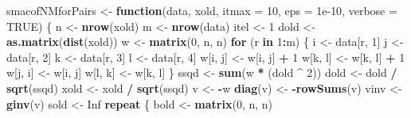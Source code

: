 \documentclass[
  12pt,
]{article}
\newenvironment{Shaded}{\begin{snugshade}}{\end{snugshade}}
\newcommand{\AttributeTok}[1]{\textcolor[rgb]{0.13,0.29,0.53}{#1}}
\newcommand{\ConstantTok}[1]{\textcolor[rgb]{0.56,0.35,0.01}{#1}}
\newcommand{\ControlFlowTok}[1]{\textcolor[rgb]{0.13,0.29,0.53}{\textbf{#1}}}
\newcommand{\DecValTok}[1]{\textcolor[rgb]{0.00,0.00,0.81}{#1}}
\newcommand{\FloatTok}[1]{\textcolor[rgb]{0.00,0.00,0.81}{#1}}
\newcommand{\FunctionTok}[1]{\textcolor[rgb]{0.13,0.29,0.53}{\textbf{#1}}}
\newcommand{\NormalTok}[1]{#1}
\newcommand{\OtherTok}[1]{\textcolor[rgb]{0.56,0.35,0.01}{#1}}
\newcommand{\SpecialCharTok}[1]{\textcolor[rgb]{0.81,0.36,0.00}{\textbf{#1}}}
\begin{document}
\begin{Shaded}
\begin{Highlighting}[]
\NormalTok{smacofNMforPairs }\OtherTok{\textless{}{-}}
  \ControlFlowTok{function}\NormalTok{(data,}
\NormalTok{           xold,}
           \AttributeTok{itmax =} \DecValTok{10}\NormalTok{,}
           \AttributeTok{eps =} \FloatTok{1e{-}10}\NormalTok{,}
           \AttributeTok{verbose =} \ConstantTok{TRUE}\NormalTok{) \{}
\NormalTok{    n }\OtherTok{\textless{}{-}} \FunctionTok{nrow}\NormalTok{(xold)}
\NormalTok{    m }\OtherTok{\textless{}{-}} \FunctionTok{nrow}\NormalTok{(data)}
\NormalTok{    itel }\OtherTok{\textless{}{-}} \DecValTok{1}
\NormalTok{    dold }\OtherTok{\textless{}{-}} \FunctionTok{as.matrix}\NormalTok{(}\FunctionTok{dist}\NormalTok{(xold))}
\NormalTok{    w }\OtherTok{\textless{}{-}} \FunctionTok{matrix}\NormalTok{(}\DecValTok{0}\NormalTok{, n, n)}
    \ControlFlowTok{for}\NormalTok{ (r }\ControlFlowTok{in} \DecValTok{1}\SpecialCharTok{:}\NormalTok{m) \{}
\NormalTok{      i }\OtherTok{\textless{}{-}}\NormalTok{ data[r, }\DecValTok{1}\NormalTok{]}
\NormalTok{      j }\OtherTok{\textless{}{-}}\NormalTok{ data[r, }\DecValTok{2}\NormalTok{]}
\NormalTok{      k }\OtherTok{\textless{}{-}}\NormalTok{ data[r, }\DecValTok{3}\NormalTok{]}
\NormalTok{      l }\OtherTok{\textless{}{-}}\NormalTok{ data[r, }\DecValTok{4}\NormalTok{]}
\NormalTok{      w[i, j] }\OtherTok{\textless{}{-}}\NormalTok{ w[i, j] }\SpecialCharTok{+} \DecValTok{1}
\NormalTok{      w[k, l] }\OtherTok{\textless{}{-}}\NormalTok{ w[k, l] }\SpecialCharTok{+} \DecValTok{1}
\NormalTok{      w[j, i] }\OtherTok{\textless{}{-}}\NormalTok{ w[i, j]}
\NormalTok{      w[l, k] }\OtherTok{\textless{}{-}}\NormalTok{ w[k, l]}
\NormalTok{    \}}
\NormalTok{    ssqd }\OtherTok{\textless{}{-}} \FunctionTok{sum}\NormalTok{(w }\SpecialCharTok{*}\NormalTok{ (dold }\SpecialCharTok{\^{}} \DecValTok{2}\NormalTok{))}
\NormalTok{    dold }\OtherTok{\textless{}{-}}\NormalTok{ dold }\SpecialCharTok{/} \FunctionTok{sqrt}\NormalTok{(ssqd)}
\NormalTok{    xold }\OtherTok{\textless{}{-}}\NormalTok{ xold }\SpecialCharTok{/} \FunctionTok{sqrt}\NormalTok{(ssqd)}
\NormalTok{    v }\OtherTok{\textless{}{-}} \SpecialCharTok{{-}}\NormalTok{w}
    \FunctionTok{diag}\NormalTok{(v) }\OtherTok{\textless{}{-}} \SpecialCharTok{{-}}\FunctionTok{rowSums}\NormalTok{(v)}
\NormalTok{    vinv }\OtherTok{\textless{}{-}} \FunctionTok{ginv}\NormalTok{(v)}
\NormalTok{    sold }\OtherTok{\textless{}{-}} \ConstantTok{Inf}
    \ControlFlowTok{repeat}\NormalTok{ \{}
\NormalTok{      bold }\OtherTok{\textless{}{-}} \FunctionTok{matrix}\NormalTok{(}\DecValTok{0}\NormalTok{, n, n)}

\end{Highlighting}
\end{Shaded}
\end{document}
